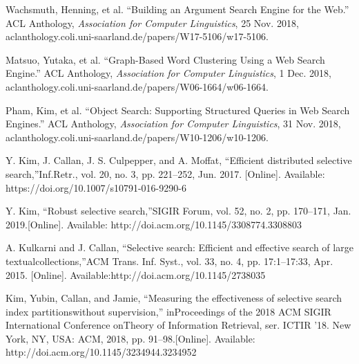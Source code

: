 \documentclass{article}
\begin{document}
\begin{thebibliography}{999}
Wachsmuth, Henning, et al. “Building an Argument Search Engine for the Web.” ACL Anthology, \emph{Association for Computer Linguistics}, 25 Nov. 2018, aclanthology.coli.uni-saarland.de/papers/W17-5106/w17-5106.

Matsuo, Yutaka, et al. “Graph-Based Word Clustering Using a Web Search Engine.” ACL Anthology, \emph{Association for Computer Linguistics}, 1 Dec. 2018, aclanthology.coli.uni-saarland.de/papers/W06-1664/w06-1664.

Pham, Kim, et al. “Object Search: Supporting Structured Queries in Web Search Engines.” ACL Anthology, \emph{Association for Computer Linguistics}, 31 Nov. 2018, aclanthology.coli.uni-saarland.de/papers/W10-1206/w10-1206.

Y. Kim, J. Callan, J. S. Culpepper, and A. Moffat, “Efficient distributed selective search,”Inf.Retr., vol. 20, no. 3, pp. 221–252, Jun. 2017. [Online]. Available: https://doi.org/10.1007/s10791-016-9290-6

Y. Kim, “Robust selective search,”SIGIR Forum, vol. 52, no. 2, pp. 170–171, Jan. 2019.[Online]. Available: http://doi.acm.org/10.1145/3308774.3308803

A. Kulkarni and J. Callan, “Selective search:  Efficient and effective search of large textualcollections,”ACM Trans. Inf. Syst., vol. 33, no. 4, pp. 17:1–17:33, Apr. 2015. [Online]. Available:http://doi.acm.org/10.1145/2738035

Kim, Yubin, Callan, and Jamie, “Measuring the effectiveness of selective search index partitionswithout supervision,” inProceedings of the 2018 ACM SIGIR International Conference onTheory of Information Retrieval, ser. ICTIR ’18.  New York, NY, USA: ACM, 2018, pp. 91–98.[Online]. Available: http://doi.acm.org/10.1145/3234944.3234952

\end{thebibliography}
\end{document}
